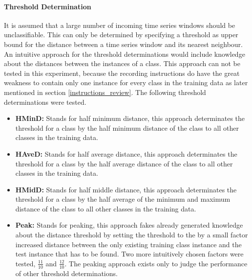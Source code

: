 \paragraph{Threshold Determination} \label{threshold_determination}
It is assumed that a large number of incoming time series windows should be unclassifiable. This can only be determined
by specifying a threshold as upper bound for the distance between a time series window and its nearest neighbour. An
intuitive approach for the threshold determinations would include knowledge about the distances between the instances of
a class. This approach can not be tested in this experiment, because the recording instructions do have the great weakness
to contain only one instance for every class in the training data as later mentioned in section \ref{instructions_review}. The
following threshold determinations were tested.

\begin{itemize}
    \item \textbf{HMinD:} Stands for half minimum distance, this approach determinates the threshold for a class by the
        half minimum distance of the class to all other classes in the training data.
    \item \textbf{HAveD:} Stands for half average distance, this approach determinates the threshold for a class by the
        half average distance of the class to all other classes in the training data.
    \item \textbf{HMidD:} Stands for half middle distance, this approach determinates the threshold for a class by the
        half average of the minimum and maximum distance of the class to all other classes in the training data.
    \item \textbf{Peak:} Stands for peaking, this approach fakes already generated knowledge about the distance
        threshold by setting the threshold to the by a small factor increased distance between the only existing
        training class instance and the test instance that has to be found. Two more intuitively chosen factors were
        tested, $\frac{11}{10}$ and $\frac{12}{10}$. The peaking approach exists only to judge the performance of other
        threshold determinations.
\end{itemize}
